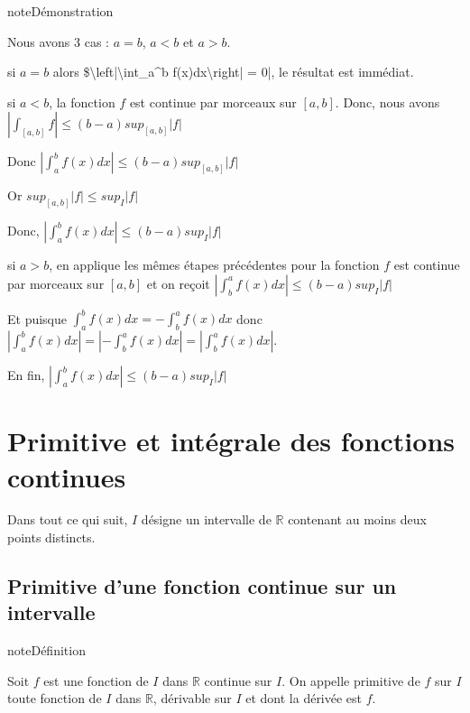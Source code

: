 \documentclass[letterpaper,10pt,french]{jupyterBook}
\begin{document}
\begin{sphinxadmonition}{note}{Démonstration}

\sphinxAtStartPar
Nous avons 3 cas : \(a=b\), \(a<b\) et \(a>b\).

\sphinxhyphen{} si \(a=b\) alors \$\textbackslash{}left|\textbackslash{}int\_a\textasciicircum{}b f(x)dx\textbackslash{}right| = 0|, le résultat est immédiat.

\sphinxhyphen{} si \(a<b\), la fonction \(f\) est continue par morceaux sur \([a, b]\). Donc, nous avons \(\left|\int_{[a, b]}f \right| \leq (b-a)sup_{[a, b]}|f|\)

\sphinxAtStartPar
Donc \(\left|\int_{a}^bf(x)dx \right| \leq (b-a)sup_{[a, b]}|f|\)

\sphinxAtStartPar
Or \(sup_{[a, b]}|f| \leq sup_{I}|f|\)

\sphinxAtStartPar
Donc, \(\left|\int_{a}^bf(x)dx \right| \leq (b-a)sup_{I}|f|\)

\sphinxhyphen{} si \(a>b\), en applique les mêmes étapes précédentes pour la fonction \(f\) est continue par morceaux sur \([a, b]\) et on reçoit \(\left|\int_{b}^af(x)dx \right| \leq (b-a)sup_{I}|f|\)

\sphinxAtStartPar
Et puisque \(\int_a^b f(x)dx = - \int_b^a f(x)dx\) donc \(\left|\int_a^b f(x)dx\right| = \left|- \int_b^a f(x)dx\right| = \left| \int_b^a f(x)dx\right|\).

\sphinxAtStartPar
En fin, \(\left|\int_{a}^bf(x)dx \right| \leq (b-a)sup_{I}|f|\)
\end{sphinxadmonition}


\section{Primitive et intégrale des fonctions continues}
\label{\detokenize{pintfc:primitive-et-integrale-des-fonctions-continues}}\label{\detokenize{pintfc::doc}}
\sphinxAtStartPar
Dans tout ce qui suit, \(I\) désigne un intervalle de \(\mathbb R\) contenant au moins deux points distincts.


\subsection{Primitive d’une fonction continue sur un intervalle}
\label{\detokenize{pintfc:primitive-d-une-fonction-continue-sur-un-intervalle}}
\begin{sphinxadmonition}{note}{Définition}

\sphinxAtStartPar
Soit \(f\) est une fonction de \(I\) dans \(\mathbb R\) continue sur \(I\). On appelle primitive de \(f\) sur \(I\) toute fonction de \(I\) dans \(\mathbb R\), dérivable sur \(I\) et dont la dérivée est \(f\).
\end{sphinxadmonition}
\end{document}
